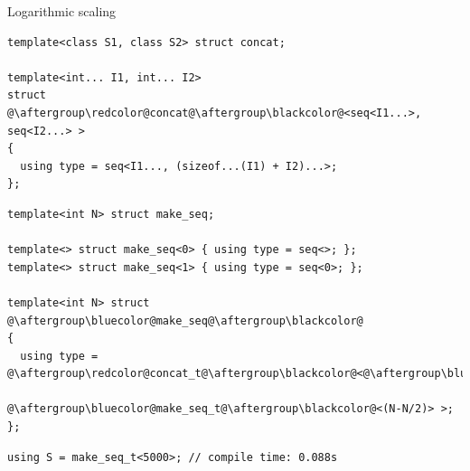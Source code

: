 \documentclass[xcolor=dvipsnames]{beamer}
\begin{document}
\begin{frame}[fragile]{Logarithmic scaling}
\begin{lstlisting}
template<class S1, class S2> struct concat;

template<int... I1, int... I2>
struct @\aftergroup\redcolor@concat@\aftergroup\blackcolor@<seq<I1...>, seq<I2...> >
{
  using type = seq<I1..., (sizeof...(I1) + I2)...>;
};
\end{lstlisting}

\begin{lstlisting}
template<int N> struct make_seq;

template<> struct make_seq<0> { using type = seq<>; };
template<> struct make_seq<1> { using type = seq<0>; };

template<int N> struct @\aftergroup\bluecolor@make_seq@\aftergroup\blackcolor@
{
  using type = @\aftergroup\redcolor@concat_t@\aftergroup\blackcolor@<@\aftergroup\bluecolor@make_seq_t@\aftergroup\blackcolor@<(N/2)>,
                        @\aftergroup\bluecolor@make_seq_t@\aftergroup\blackcolor@<(N-N/2)> >;
};
\end{lstlisting}

\begin{lstlisting}
using S = make_seq_t<5000>; // compile time: 0.088s
\end{lstlisting}
\end{frame}
\end{document}
